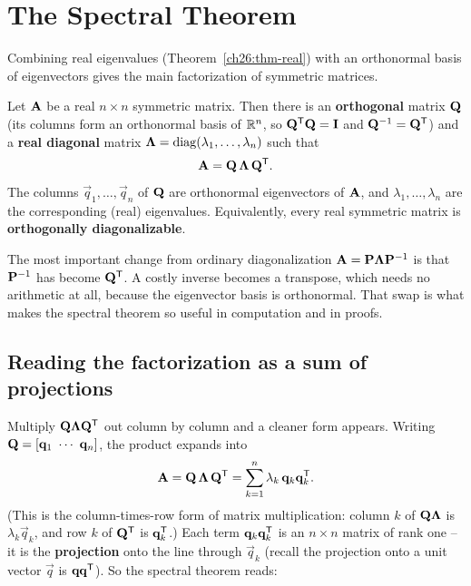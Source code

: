\section{The Spectral Theorem}
\label{ch26:spectral-theorem}

Combining real eigenvalues (Theorem~\ref{ch26:thm-real}) with an
orthonormal basis of eigenvectors gives the main factorization
of symmetric matrices.

\begin{formalbox}
\begin{theorem}
\label{ch26:thm-spectral}
Let $\mathbf{A}$ be a real $n\times n$ symmetric matrix. Then there is an
\textbf{orthogonal} matrix $\mathbf{Q}$ (its columns form an orthonormal basis of
$\mathbb{R}^n$, so $\mathbf{Q}^{\mathsf{T}}\mathbf{Q}=\mathbf{I}$ and $\mathbf{Q}^{-1}=\mathbf{Q}^{\mathsf{T}}$) and a
\textbf{real diagonal} matrix $\mathbf{\Lambda}=\operatorname{diag}(\lambda_1,\dots,\lambda_n)$
such that
\[
  \mathbf{A} = \mathbf{Q}\,\mathbf{\Lambda}\,\mathbf{Q}^{\mathsf{T}}.
\]
The columns $\vec{q}_1,\dots,\vec{q}_n$ of $\mathbf{Q}$ are orthonormal eigenvectors
of $\mathbf{A}$, and $\lambda_1,\dots,\lambda_n$ are the corresponding (real)
eigenvalues. Equivalently, every real symmetric matrix is \textbf{orthogonally
diagonalizable}.
\end{theorem}
\end{formalbox}

The most important change from ordinary diagonalization
$\mathbf{A}=\mathbf{P}\mathbf{\Lambda}\mathbf{P}^{-1}$ is that $\mathbf{P}^{-1}$ has become
$\mathbf{Q}^{\mathsf{T}}$. A costly inverse becomes a transpose, which needs no arithmetic at
all, because the eigenvector basis is orthonormal. That swap is what makes the
spectral theorem so useful in computation and in proofs.

\subsection{Reading the factorization as a sum of projections}
\label{ch26:sum-of-projections}

Multiply $\mathbf{Q}\mathbf{\Lambda}\mathbf{Q}^{\mathsf{T}}$ out column by column and a cleaner form
appears. Writing $\mathbf{Q}=[\mathbf{q}_1\ \cdots\ \mathbf{q}_n]$, the product expands into
\[
  \mathbf{A} = \mathbf{Q}\,\mathbf{\Lambda}\,\mathbf{Q}^{\mathsf{T}}
  = \sum_{k=1}^{n} \lambda_k\,\mathbf{q}_k\mathbf{q}_k^{\mathsf{T}}.
\]
(This is the column-times-row form of matrix multiplication: column $k$ of
$\mathbf{Q}\mathbf{\Lambda}$ is $\lambda_k\vec{q}_k$, and row $k$ of $\mathbf{Q}^{\mathsf{T}}$ is
$\mathbf{q}_k^{\mathsf{T}}$.) Each term $\mathbf{q}_k\mathbf{q}_k^{\mathsf{T}}$ is an $n\times n$ matrix of rank one -- it is the
\textbf{projection} onto the line through $\vec{q}_k$ (recall the projection onto a
unit vector $\vec{q}$ is $\mathbf{q}\mathbf{q}^{\mathsf{T}}$). So the spectral theorem reads:

